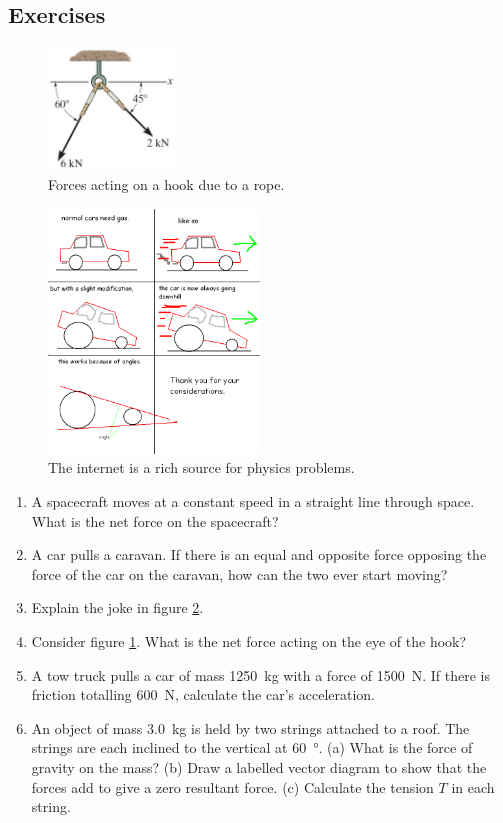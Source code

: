 \documentclass[a4paper]{amsbook}
\newcommand\capcite[1]{}
\begin{document}
\subsection{Exercises}
\begin{figure}
  \centering
  \includegraphics[width=0.3\textwidth]{resultantex}
  \caption{Forces acting on a hook due to a rope. \capcite{http://s3.amazonaws.com/answer-board-image/2ace727f-4377-4440-82e1-17b6311a624b.bmp}\label{fig:resultantex}}
\end{figure}
\begin{figure}
  \centering
  \includegraphics[width=0.5\textwidth]{downhill}
  \caption{The internet is a rich source for physics problems.\label{fig:downhill}}
\end{figure}
\begin{enumerate}
  \item A spacecraft moves at a constant speed in a straight line through space. What is the net force on the spacecraft?
  \item A car pulls a caravan. If there is an equal and opposite force opposing the force of the car on
        the caravan, how can the two ever start moving?
  \item Explain the joke in figure \ref{fig:downhill}.
  \item Consider figure \ref{fig:resultantex}. What is the net force acting on the eye of the hook?
  \item A tow truck pulls a car of mass \SI{1250}{\kilo\gram} with a force of \SI{1500}{\newton}. If there is
        friction totalling \SI{600}{\newton}, calculate the car's acceleration.
  \item An object of mass \SI{3.0}{\kilo\gram} is held by two strings attached to a roof. The strings are
        each inclined to the vertical at \SI{60}{\degree}. (a) What is the force of gravity on the mass?
        (b) Draw a labelled vector diagram to show that the forces add to give a zero resultant force. (c)
        Calculate the tension $ T $ in each string.
\end{enumerate}
\end{document}
